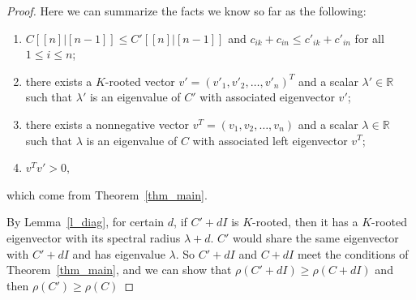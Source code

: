 \documentclass[12pt, a4paper]{article}
\theoremstyle{plain}
\theoremstyle{definition}
\begin{document}
\begin{proof}
    Here we can summarize the facts we know so far as the following:
    \begin{enumerate}[label=(\roman*)]
        \item  $C[[n]|[n-1]]\leq C'[[n]|[n-1]]$ and $c_{ik}+c_{in}\leq c'_{ik}+c'_{in}$ for all $1\leq i\leq n$;
        \item  there exists a $K$-rooted vector $v'=(v'_1, v'_2, \ldots, v'_n)^T$ and a scalar $\lambda'\in \mathbb{R}$
        such that $\lambda'$ is an eigenvalue of $C'$ with associated eigenvector $v'$;
        \item there exists a nonnegative vector $v^T=(v_1, v_2, \ldots, v_n)$ and a scalar $\lambda\in \mathbb{R}$ such that $\lambda$ is an eigenvalue of $C$ with associated left eigenvector $v^T$;
        \item $v^Tv'>0,$
    \end{enumerate}
    which come from Theorem~\ref{thm_main}.

    By Lemma~\ref{l_diag}, for certain $d$, if $C'+dI$ is $K$-rooted, then it has
    a $K$-rooted eigenvector with its spectral radius $\lambda + d$. $C'$ would share the same
    eigenvector with $C'+dI$ and has eigenvalue $\lambda$. So $C'+dI$ and $C+dI$ meet the
    conditions of Theorem~\ref{thm_main}, and we can show that $\rho(C' + dI) \geq \rho(C +dI)$ and
    then $\rho(C') \geq \rho(C)$  %
\end{proof}
\end{document}

